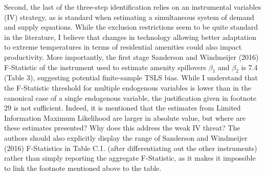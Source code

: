 \documentclass[12pt, final]{article}
\begin{document}
Second, the last of the three-step identification relies on an instrumental variables (IV) strategy, as is standard when estimating a simultaneous system of demand and supply equations. 
While the exclusion restrictions seem to be quite standard in the literature, I believe that changes in technology allowing better adaptation to extreme temperatures in terms of residential amenities could also impact productivity.
More importantly, the first stage Sanderson and Windmeijer (2016) F-Statistic of the instrument used to estimate amenity spillovers $\beta_1$ and $\beta_2$ is 7.4 (Table 3), suggesting potential finite-sample TSLS bias. While I understand that the F-Statistic threshold for multiple endogenous variables is lower than in the canonical case of a single endogenous variable, the justification given in footnote $29$ is not sufficient. Indeed, it is mentioned that the estimates from Limited Information Maximum Likelihood are larger in absolute value, but where are these estimates presented? Why does this address the weak IV threat? The authors should also explicitly display the range of Sanderson and Windmeijer (2016) F-Statistics in Table C.1. (after differentiating out the other instruments) rather than simply reporting the aggregate F-Statistic, as it makes it impossible to link the footnote mentioned above to the table.
\\
\end{document}
